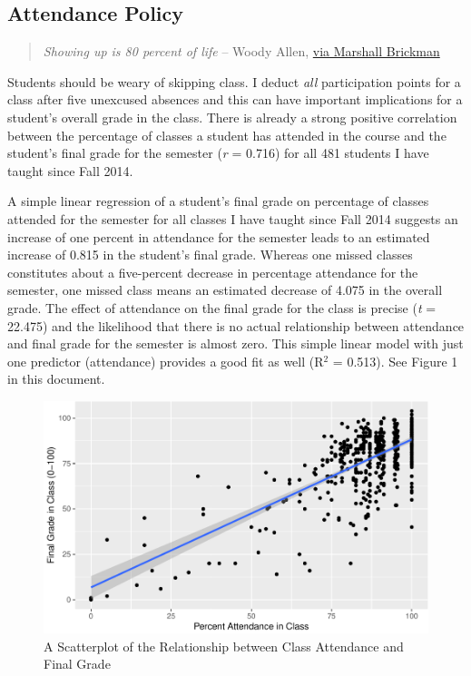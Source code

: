 \documentclass[11pt,]{article}
\makeatletter
\def\maxwidth{\ifdim\Gin@nat@width>\linewidth\linewidth
\else\Gin@nat@width\fi}
\let\Oldincludegraphics\includegraphics
\renewcommand{\includegraphics}[1]{\Oldincludegraphics[width=\maxwidth]{#1}}
\makeatother
\begin{document}
\subsection{Attendance Policy}\label{attendance-policy}

\begin{quote}
\emph{Showing up is 80 percent of life} -- Woody Allen,
\href{http://quoteinvestigator.com/2013/06/10/showing-up/\#note-6553-1}{via
Marshall Brickman}
\end{quote}

Students should be weary of skipping class. I deduct \emph{all}
participation points for a class after five unexcused absences and this
can have important implications for a student's overall grade in the
class. There is already a strong positive correlation between the
percentage of classes a student has attended in the course and the
student's final grade for the semester (\emph{r} = 0.716) for all 481
students I have taught since Fall 2014.

A simple linear regression of a student's final grade on percentage of
classes attended for the semester for all classes I have taught since
Fall 2014 suggests an increase of one percent in attendance for the
semester leads to an estimated increase of 0.815 in the student's final
grade. Whereas one missed classes constitutes about a five-percent
decrease in percentage attendance for the semester, one missed class
means an estimated decrease of 4.075 in the overall grade. The effect of
attendance on the final grade for the class is precise (\emph{t} =
22.475) and the likelihood that there is no actual relationship between
attendance and final grade for the semester is almost zero. This simple
linear model with just one predictor (attendance) provides a good fit as
well (R\(^2\) = 0.513). See Figure 1 in this document.

\begin{figure}
\centering
\includegraphics{svm-rmarkdown-syllabus-example_files/figure-latex/attendplot-1.pdf}
\caption{A Scatterplot of the Relationship between Class Attendance and
Final Grade}
\end{figure}
\end{document}
